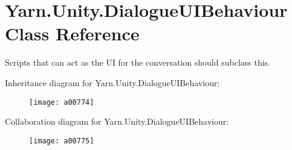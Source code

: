 \hypertarget{a00089}{\section{Yarn.\-Unity.\-Dialogue\-U\-I\-Behaviour Class Reference}
\label{a00089}
}


Scripts that can act as the U\-I for the conversation should subclass this.  




Inheritance diagram for Yarn.\-Unity.\-Dialogue\-U\-I\-Behaviour\-:
\nopagebreak
\begin{figure}[H]
\begin{center}
\leavevmode
\texttt{[image: a00774]}
\end{center}
\end{figure}


Collaboration diagram for Yarn.\-Unity.\-Dialogue\-U\-I\-Behaviour\-:
\nopagebreak
\begin{figure}[H]
\begin{center}
\leavevmode
\texttt{[image: a00775]}
\end{center}
\end{figure}
